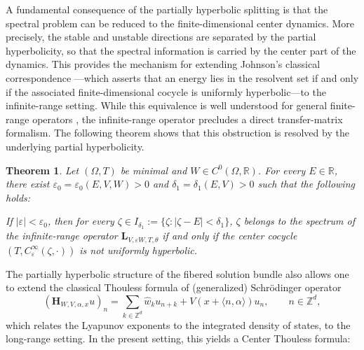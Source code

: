 \documentclass[reqno,11pt]{amsart}
\newtheorem{theorem}{Theorem}[section]
\begin{document}
A fundamental consequence of the partially hyperbolic splitting is that the spectral problem can be reduced to the finite-dimensional center dynamics. More precisely, the stable and unstable directions are separated by the partial hyperbolicity, so that the spectral information  is carried by the center part of the dynamics. This provides the mechanism for extending Johnson's classical correspondence \cite{Johnson}---which asserts that an energy lies in the resolvent set if and only if the associated finite-dimensional cocycle is uniformly hyperbolic---to the infinite-range setting. While this equivalence is well understood for general finite-range operators \cite{HaroPuig}, the infinite-range operator precludes a direct transfer-matrix formalism. The following theorem shows that this obstruction is resolved by the underlying partial hyperbolicity.


\begin{theorem}
\label{thm:Johnson_generalization}
Let $(\Omega,T)$ be minimal and
$W\in C^0(\Omega,\mathbb R)$.
For every $E\in\mathbb R$, there exist
$\varepsilon_0=\varepsilon_0(E,V,W)>0$
and
$\delta_1=\delta_1(E,V)>0$
such that the following holds:

If $|\varepsilon|<\varepsilon_0$, then for every
$\zeta\in I_{\delta_1}:=\{\zeta:|\zeta-E|<\delta_1\}$,  $\zeta$ belongs to the spectrum of the infinite-range  operator $\mathbf{L}_{V,\varepsilon W,T,\theta}$
if and only if the center cocycle
$(T,C^\infty_\varepsilon(\zeta,\cdot))$
is not uniformly hyperbolic.
\end{theorem}



The  partially hyperbolic structure of the fibered solution bundle also allows one to extend the classical Thouless formula \cite{AS,HaroPuig} of (generalized) Schr\"odinger operator\begin{equation}\label{eq:long_range_phys}
(\mathbf H_{W,V,\alpha,x}u)_n=
\sum_{k\in\mathbb Z^d}\widehat w_k u_{n+k}+V(x+\langle n,\alpha\rangle)u_n,
\qquad n\in\mathbb Z^d,
\end{equation} which relates the Lyapunov exponents to the integrated density of states, to the long-range setting. In the present setting, this yields a Center Thouless formula:
\end{document}
